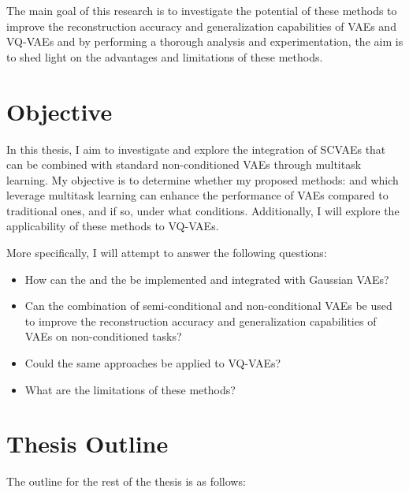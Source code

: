 The main goal of this research is to investigate the potential of these methods to improve the reconstruction accuracy and generalization capabilities of VAEs and VQ-VAEs and by performing a thorough analysis and experimentation, the aim is to shed light on the advantages and limitations of these methods.

\section{Objective}

In this thesis, I aim to investigate and explore the integration of SCVAEs that can be combined with standard non-conditioned VAEs through multitask learning. My objective is to determine whether my proposed methods:  and  which leverage multitask learning can enhance the performance of VAEs compared to traditional ones, and if so, under what conditions. Additionally, I will explore the applicability of these methods to VQ-VAEs.

More specifically, I will attempt to answer the following questions:

\begin{itemize}
    \item How can the  and the  be implemented and integrated with Gaussian VAEs?
    \item Can the combination of semi-conditional and non-conditional VAEs be used to improve the reconstruction accuracy and generalization capabilities of VAEs on non-conditioned tasks?
    \item Could the same approaches be applied to VQ-VAEs?
    \item What are the limitations of these methods?

\end{itemize}

\section{Thesis Outline}

The outline for the rest of the thesis is as follows:

